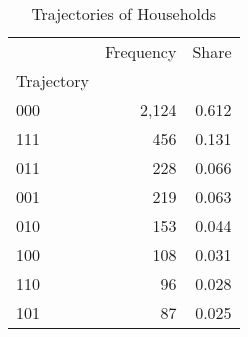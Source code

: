 \begin{table}
\caption{Trajectories of Households}
\label{tbl:trajectories}
\begin{tabular}{lrr}
\toprule
 & Frequency & Share \\
Trajectory &  &  \\
\midrule
000 & 2,124 & 0.612 \\
111 & 456 & 0.131 \\
011 & 228 & 0.066 \\
001 & 219 & 0.063 \\
010 & 153 & 0.044 \\
100 & 108 & 0.031 \\
110 & 96 & 0.028 \\
101 & 87 & 0.025 \\
\bottomrule
\end{tabular}
\end{table}
